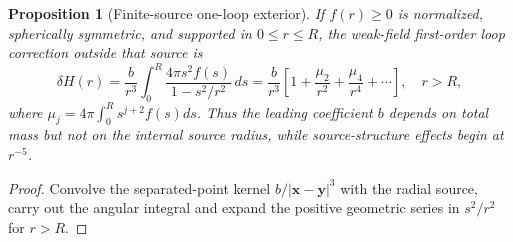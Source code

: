 \documentclass[11pt,a4paper]{article}
\newtheorem{proposition}[theorem]{Proposition}
\theoremstyle{remark}
\begin{document}
\begin{proposition}[Finite-source one-loop exterior]\label{prop:finiteb}
If $f(r)\ge0$ is normalized, spherically symmetric, and supported in
$0\le r\le R$, the weak-field first-order loop correction outside that
source is
\begin{equation}\label{eq:finiteb}
\boxed{\delta H(r)=\frac{b}{r^3}
\int_0^R\frac{4\pi s^2f(s)}{1-s^2/r^2}\,ds
=\frac{b}{r^3}\left[1+\frac{\mu_2}{r^2}
+\frac{\mu_4}{r^4}+\cdots\right],\quad r>R,}
\end{equation}
where $\mu_j=4\pi\int_0^R s^{j+2}f(s)ds$. Thus the leading coefficient
$b$ depends on total mass but not on the internal source radius, while
source-structure effects begin at $r^{-5}$.
\end{proposition}
\begin{proof}
Convolve the separated-point kernel $b/|\mathbf x-\mathbf y|^3$
with the radial source, carry out the angular integral and expand the
positive geometric series in $s^2/r^2$ for $r>R$.\end{proof}
\end{document}
